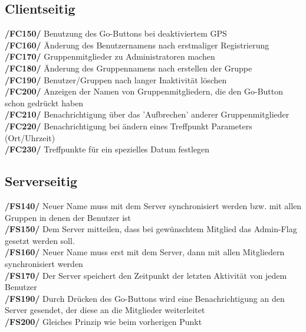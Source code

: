 \subsection{Clientseitig}
     \textbf{/FC150/} Benutzung des Go-Buttons bei deaktiviertem GPS\\
     \textbf{/FC160/} Änderung des Benutzernamens nach erstmaliger Registrierung\\
     \textbf{/FC170/} Gruppenmitglieder zu Administratoren machen                \\
     \textbf{/FC180/} Änderung des Gruppennamens nach erstellen der Gruppe        \\
     \textbf{/FC190/} Benutzer/Gruppen nach langer Inaktivität löschen                     \\
     \textbf{/FC200/} Anzeigen der Namen von Gruppenmitgliedern, die den Go-Button schon gedrückt haben\\
     \textbf{/FC210/} Benachrichtigung über das 'Aufbrechen' anderer Gruppenmitglieder\\
     \textbf{/FC220/} Benachrichtigung bei ändern eines Treffpunkt Parameters (Ort/Uhrzeit)\\
     \textbf{/FC230/} Treffpunkte für ein spezielles Datum festlegen\\
\subsection{Serverseitig}
     \textbf{/FS140/} Neuer Name muss mit dem Server synchronisiert werden bzw. mit allen Gruppen in denen der Benutzer ist\\
     \textbf{/FS150/} Dem Server mitteilen, dass bei gewünschtem Mitglied das Admin-Flag gesetzt werden soll.\\
     \textbf{/FS160/} Neuer Name muss erst mit dem Server, dann mit allen Mitgliedern synchronisiert werden\\
     \textbf{/FS170/} Der Server speichert den Zeitpunkt der letzten Aktivität von jedem Benutzer\\
     \textbf{/FS190/} Durch Drücken des Go-Buttons wird eine Benachrichtigung an den Server gesendet, der diese an die Mitglieder weiterleitet\\
     \textbf{/FS200/} Gleiches Prinzip wie beim vorherigen Punkt\\
